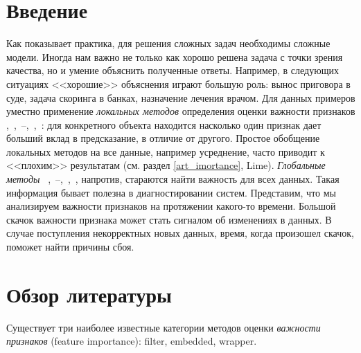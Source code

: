 \documentclass[12pt]{article}
\begin{document}
    
    

\newpage
\section{Введение}
Как показывает практика, для решения сложных задач необходимы сложные модели. Иногда нам важно не только как хорошо решена задача с точки зрения качества, но и умение объяснить полученные ответы. Например, в следующих ситуациях <<хорошие>> объяснения играют большую роль: вынос приговора в суде, задача скоринга в банках, назначение лечения врачом. Для данных примеров уместно применение \emph{локальных методов} определения оценки важности признаков \cite{quant_shap},~\citep{deepshap},~\citep{CXplain}--\cite{breakDown},~\citep{shap_perm},~\citep{PRoFILE}: для конкретного объекта находится насколько один признак дает больший вклад в предсказание, в отличие от другого. Простое обобщение локальных методов на все данные, например усреднение, часто приводит к <<плохим>> результатам (см. раздел \ref{art_imortance}, Lime). \emph{Глобальные методы} ~\cite{mcr},~\citep{stat_int_imp}--\cite{mdi_randomized},~\citep{context_imp},~\citep{FIR}, напротив, стараются найти важность для всех данных. Такая информация бывает полезна в диагностировании систем. Представим, что мы анализируем важности признаков на протяжении какого-то времени. Большой скачок важности признака может стать сигналом об изменениях в данных. В случае поступления некорректных новых данных, время, когда произошел скачок, поможет найти причины сбоя.



\section{Обзор литературы}
Существует три наиболее известные категории методов оценки \emph{важности признаков} (feature importance): filter, embedded, wrapper.
\end{document}
